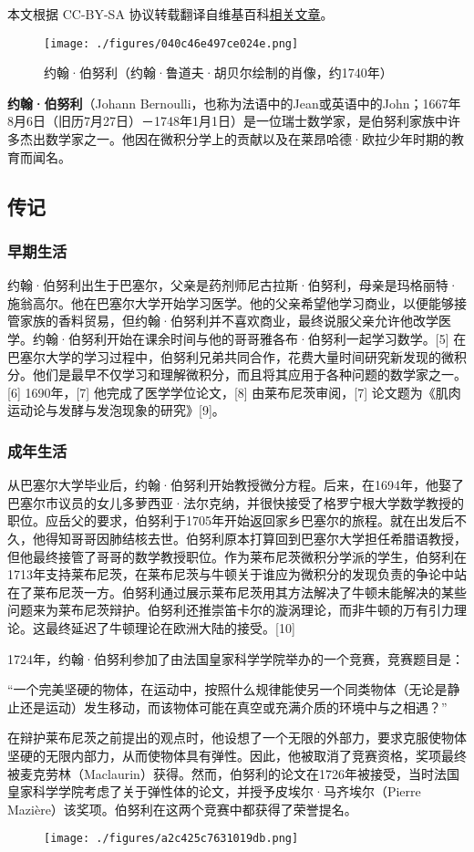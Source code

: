 
本文根据 CC-BY-SA 协议转载翻译自维基百科\href{https://en.wikipedia.org/wiki/Johann_Bernoulli}{相关文章}。

\begin{figure}[ht]
\centering
\texttt{[image: ./figures/040c46e497ce024e.png]}
\caption{约翰·伯努利（约翰·鲁道夫·胡贝尔绘制的肖像，约1740年）} \label{fig_YHBNL_1}
\end{figure}
\textbf{约翰·伯努利}（Johann Bernoulli，也称为法语中的Jean或英语中的John；1667年8月6日（旧历7月27日）－1748年1月1日）是一位瑞士数学家，是伯努利家族中许多杰出数学家之一。他因在微积分学上的贡献以及在莱昂哈德·欧拉少年时期的教育而闻名。
\subsection{传记}  
\subsubsection{早期生活}  
约翰·伯努利出生于巴塞尔，父亲是药剂师尼古拉斯·伯努利，母亲是玛格丽特·施翁高尔。他在巴塞尔大学开始学习医学。他的父亲希望他学习商业，以便能够接管家族的香料贸易，但约翰·伯努利并不喜欢商业，最终说服父亲允许他改学医学。约翰·伯努利开始在课余时间与他的哥哥雅各布·伯努利一起学习数学。[5] 在巴塞尔大学的学习过程中，伯努利兄弟共同合作，花费大量时间研究新发现的微积分。他们是最早不仅学习和理解微积分，而且将其应用于各种问题的数学家之一。[6] 1690年，[7] 他完成了医学学位论文，[8] 由莱布尼茨审阅，[7] 论文题为《肌肉运动论与发酵与发泡现象的研究》[9]。
\subsubsection{成年生活} 
从巴塞尔大学毕业后，约翰·伯努利开始教授微分方程。后来，在1694年，他娶了巴塞尔市议员的女儿多萝西亚·法尔克纳，并很快接受了格罗宁根大学数学教授的职位。应岳父的要求，伯努利于1705年开始返回家乡巴塞尔的旅程。就在出发后不久，他得知哥哥因肺结核去世。伯努利原本打算回到巴塞尔大学担任希腊语教授，但他最终接管了哥哥的数学教授职位。作为莱布尼茨微积分学派的学生，伯努利在1713年支持莱布尼茨，在莱布尼茨与牛顿关于谁应为微积分的发现负责的争论中站在了莱布尼茨一方。伯努利通过展示莱布尼茨用其方法解决了牛顿未能解决的某些问题来为莱布尼茨辩护。伯努利还推崇笛卡尔的漩涡理论，而非牛顿的万有引力理论。这最终延迟了牛顿理论在欧洲大陆的接受。[10]

1724年，约翰·伯努利参加了由法国皇家科学学院举办的一个竞赛，竞赛题目是：

“一个完美坚硬的物体，在运动中，按照什么规律能使另一个同类物体（无论是静止还是运动）发生移动，而该物体可能在真空或充满介质的环境中与之相遇？”

在辩护莱布尼茨之前提出的观点时，他设想了一个无限的外部力，要求克服使物体坚硬的无限内部力，从而使物体具有弹性。因此，他被取消了竞赛资格，奖项最终被麦克劳林（Maclaurin）获得。然而，伯努利的论文在1726年被接受，当时法国皇家科学学院考虑了关于弹性体的论文，并授予皮埃尔·马齐埃尔（Pierre Mazière）该奖项。伯努利在这两个竞赛中都获得了荣誉提名。
\begin{figure}[ht]
\centering
\texttt{[image: ./figures/a2c425c7631019db.png]}
\caption{} \label{fig_YHBNL_2}
\end{figure}